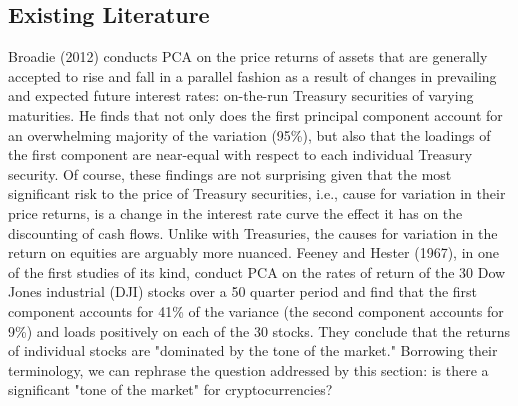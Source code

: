 \documentclass[12pt,twoside]{article}
\begin{document}
\subsection*{Existing Literature}
Broadie (2012) conducts PCA on the price returns of assets that are generally accepted to rise and fall in a parallel fashion as a result of changes in prevailing and expected future interest rates: on-the-run Treasury securities of varying maturities. He finds that not only does the first principal component account for an overwhelming majority of the variation (95\%), but also that the loadings of the first component are near-equal with respect to each individual Treasury security. Of course, these findings are not surprising given that the most significant risk to the price of Treasury securities, i.e., cause for variation in their price returns, is a change in the interest rate curve the effect it has on the discounting of cash flows. Unlike with Treasuries, the causes for variation in the return on equities are arguably more nuanced. Feeney and Hester (1967), in one of the first studies of its kind, conduct PCA on the rates of return of the 30 Dow Jones industrial (DJI) stocks over a 50 quarter period and find that the first component accounts for 41\% of the variance (the second component accounts for 9\%) and loads positively on each of the 30 stocks. They conclude that the returns of individual stocks are "dominated by the tone of the market." Borrowing their terminology, we can rephrase the question addressed by this section: is there a significant "tone of the market" for cryptocurrencies?
\end{document}
